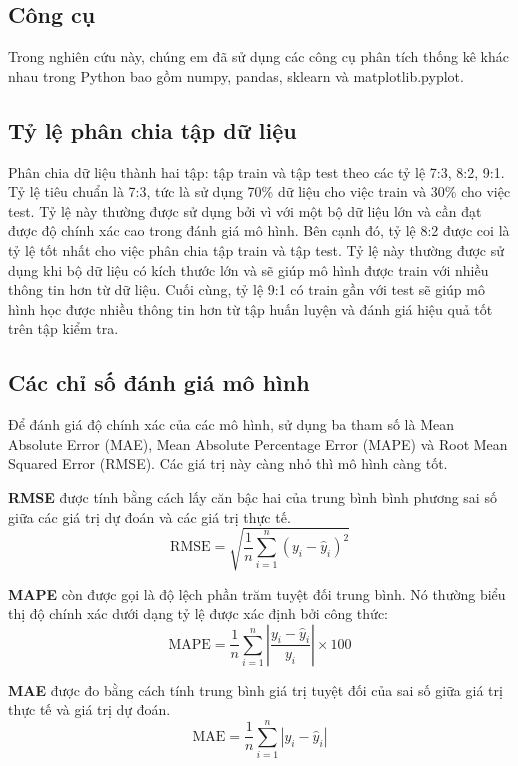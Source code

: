 \subsection{Công cụ}
Trong nghiên cứu này, chúng em đã sử dụng các công cụ phân tích thống kê khác nhau trong Python bao gồm numpy, pandas, sklearn và matplotlib.pyplot.

\subsection{Tỷ lệ phân chia tập dữ liệu}
Phân chia dữ liệu thành hai tập: tập train và tập test theo các tỷ lệ 7:3, 8:2, 9:1. Tỷ lệ tiêu chuẩn là 7:3, tức là sử dụng 70\% dữ liệu cho việc train và 30\% cho việc test. Tỷ lệ này thường được sử dụng bởi vì với một bộ dữ liệu lớn và cần đạt được độ chính xác cao trong đánh giá mô hình. Bên cạnh đó, tỷ lệ 8:2 được coi là tỷ lệ tốt nhất cho việc phân chia tập train và tập test. Tỷ lệ này thường được sử dụng khi bộ dữ liệu có kích thước lớn và sẽ giúp mô hình được train với nhiều thông tin hơn từ dữ liệu. Cuối cùng, tỷ lệ 9:1 có train gần với test sẽ giúp mô hình học được nhiều thông tin hơn từ tập huấn luyện và đánh giá hiệu quả tốt trên tập kiểm tra.

\subsection{Các chỉ số đánh giá mô hình}
Để đánh giá độ chính xác của các mô hình, sử dụng ba tham số là Mean Absolute Error (MAE), Mean Absolute Percentage Error (MAPE) và Root Mean Squared Error (RMSE). Các giá trị này càng nhỏ thì mô hình càng tốt.
\par
\textbf{RMSE} được tính bằng cách lấy căn bậc hai của trung bình bình phương sai số giữa các giá trị dự đoán và các giá trị thực tế.
\[
\text{RMSE} = \sqrt{\frac{1}{n} \sum_{i=1}^{n} (y_i - \hat{y}_i)^2}
\]
\par
\textbf{MAPE} còn được gọi là độ lệch phần trăm tuyệt đối trung bình. Nó thường biểu thị độ chính xác dưới dạng tỷ lệ được xác định bởi công thức:
\[
\text{MAPE} = \frac{1}{n} \sum_{i=1}^{n} \left| \frac{y_i - \hat{y}_i}{y_i} \right| \times 100
\]
\par
\textbf{MAE} được đo bằng cách tính trung bình giá trị tuyệt đối của sai số giữa giá trị thực tế và giá trị dự đoán.
\[
\text{MAE} = \frac{1}{n} \sum_{i=1}^{n} |y_i - \hat{y}_i|
\]
